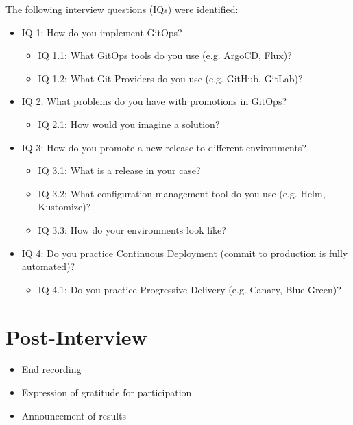 The following interview questions (IQs) were identified:

\begin{itemize}
	\item IQ 1: How do you implement GitOps?
	\begin{itemize}
		\item IQ 1.1: What GitOps tools do you use (e.g. ArgoCD, Flux)?
		\item IQ 1.2: What Git-Providers do you use (e.g. GitHub, GitLab)?
	\end{itemize}

	\item IQ 2: What problems do you have with promotions in GitOps?
	\begin{itemize}
		\item IQ 2.1: How would you imagine a solution?
	\end{itemize}

	\item IQ 3: How do you promote a new release to different environments?
	\begin{itemize}
	    \item IQ 3.1: What is a release in your case?
		\item IQ 3.2: What configuration management tool do you use (e.g. Helm, Kustomize)?
		\item IQ 3.3: How do your environments look like?
	\end{itemize}
	
	\item IQ 4: Do you practice Continuous Deployment (commit to production is fully automated)?
	\begin{itemize}
		\item IQ 4.1: Do you practice Progressive Delivery (e.g. Canary, Blue-Green)?
	\end{itemize}
\end{itemize}

\section{Post-Interview}

\begin{itemize}
	\item End recording
	\item Expression of gratitude for participation
	\item Announcement of results
\end{itemize}
